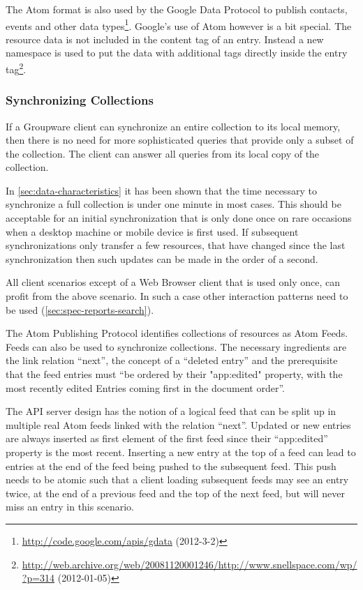 \documentclass[12pt,a4paper,twoside]{scrartcl}		%
\newcommand{\citeurl}[2]{\url{#1} (#2)}
\begin{document}
The Atom format is also used by the Google Data Protocol to publish contacts,
events and other data
types\footnote{\citeurl{http://code.google.com/apis/gdata}{2012-3-2}}. Google's
use of Atom however is a bit special. The resource data is not included in the
content tag of an entry. Instead a new namespace is used to put the data with
additional tags directly inside the entry
tag\footnote{\citeurl{http://web.archive.org/web/20081120001246/http://www.snellspace.com/wp/?p=314}{2012-01-05}}.



\subsubsection{Synchronizing Collections}
\label{sec:synchr-coll}

If a Groupware client can synchronize an entire collection to its local memory,
then there is no need for more sophisticated queries that provide only a subset
of the collection. The client can answer all queries from its local copy of the
collection.

In \autoref{sec:data-characteristics} it has been shown that the time necessary
to synchronize a full collection is under one minute in most cases. This should
be acceptable for an initial synchronization that is only done once on rare
occasions when a desktop machine or mobile device is first used. If subsequent
synchronizations only transfer a few resources, that have changed since the last
synchronization then such updates can be made in the order of a second.

All client scenarios except of a Web Browser client that is used only once, can
profit from the above scenario. In such a case other interaction patterns need
to be used (\autoref{sec:spec-reports-search}).

The Atom Publishing Protocol identifies collections of resources as Atom
Feeds. Feeds can also be used to synchronize collections. The necessary
ingredients are the link relation ``next''\cite{RFC5005}, the concept of a
``deleted entry''\cite{draft-snell-atompub-tombstones-14} and the prerequisite
that the feed entries must ``be ordered by their "app:edited" property, with the
most recently edited Entries coming first in the document
order''\cite[sec. 10]{RFC5023}.

The API server design has the notion of a logical feed that can be split up in
multiple real Atom feeds linked with the relation ``next''. Updated or new
entries are always inserted as first element of the first feed since their
``app:edited'' property is the most recent. Inserting a new entry at the top of
a feed can lead to entries at the end of the feed being pushed to the subsequent
feed. This push needs to be atomic such that a client loading subsequent feeds
may see an entry twice, at the end of a previous feed and the top of the next
feed, but will never miss an entry in this scenario.
\end{document}
